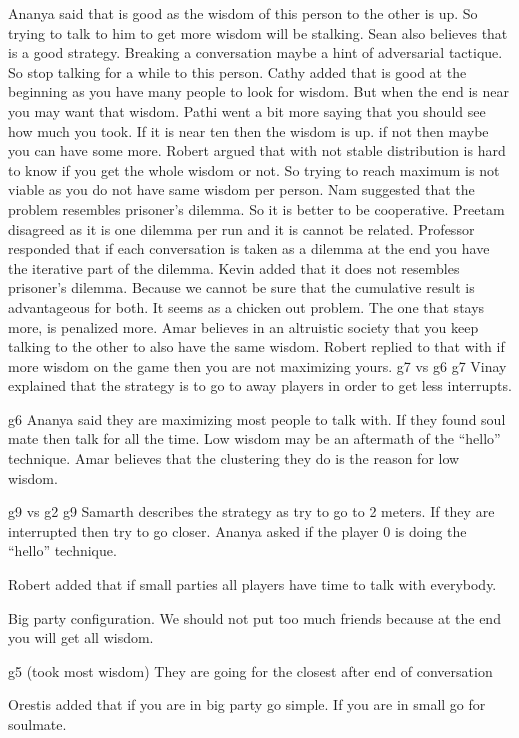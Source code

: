 Ananya said that is good as the wisdom of this person to the other is up. So trying to talk to him to get more wisdom will be stalking.
Sean also believes that is a good strategy. Breaking a conversation maybe a hint of adversarial tactique. So stop talking for a while to this person.
Cathy added that is good at the beginning as you have many people to look for wisdom. But when the end is near you may want that wisdom.
Pathi went a bit more saying that you should see how much you took. If it is near ten then the wisdom is up. if not then maybe you can have some more.
Robert argued that with not stable distribution is hard to know if you get the whole wisdom or not. So trying to reach maximum is not viable as you do not have same wisdom per person.
Nam suggested that the problem resembles prisoner’s dilemma. So it is better to be cooperative.
Preetam disagreed as it is one dilemma per run and it is cannot be related.
Professor responded that if each conversation is taken as a dilemma at the end you have the iterative part of the dilemma.
Kevin added that it does not resembles prisoner's dilemma. Because we cannot be sure that the cumulative result is advantageous for both. It seems as a chicken out problem. The one that stays more, is penalized more.
Amar believes in an altruistic society that you keep talking to the other to also have the same wisdom.
Robert replied to that with if more wisdom on the game then you are not maximizing yours.
g7 vs g6
g7 
Vinay explained that the strategy is to go to away players in order to get less interrupts.

g6
Ananya said they are maximizing most people to talk with. If they found soul mate then talk for all the time. Low wisdom may be an aftermath of the “hello” technique. 
Amar believes that the clustering they do is the reason for low wisdom.

g9 vs g2
g9 
Samarth describes the strategy as try to go to 2 meters. If they are interrupted then try to go closer.
Ananya asked if the player 0 is doing the “hello” technique. 

Robert added that if small parties all players have time to talk with everybody.

Big party configuration.
We should not put too much friends because at the end you will get all wisdom.

g5 (took most wisdom)
They are going for the closest after end of conversation

Orestis added that if you are in big party go simple. If you are in small go for soulmate.

